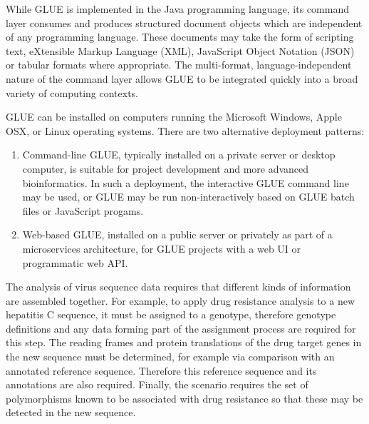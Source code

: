 While GLUE is implemented in the Java programming language, its command layer
consumes and produces structured document objects which are independent of any
programming language. These documents may take the form of scripting text,
eXtensible Markup Language (XML), JavaScript Object Notation (JSON) or tabular
formats where appropriate. The multi-format, language-independent nature of the
command layer allows GLUE to be integrated quickly into a broad variety of
computing contexts.

GLUE can be installed on computers running the Microsoft Windows, Apple OSX, or
Linux operating systems. There are two alternative deployment patterns:
\begin{enumerate}
\def\labelenumi{\arabic{enumi}.}
\item Command-line GLUE, typically installed on a private server or desktop
  computer, is suitable for project development and more advanced
  bioinformatics. In such a deployment, the interactive GLUE command line may be
  used, or GLUE may be run non-interactively based on GLUE batch files or
  JavaScript progams.
\item Web-based GLUE, installed on a public server or privately as part of a
  microservices architecture, for GLUE projects with a web UI or
  programmatic web API.
\end{enumerate}


The analysis of virus sequence data requires that different kinds of information
are assembled together. For example, to apply drug resistance analysis to a new
hepatitis C sequence, it must be assigned to a genotype, therefore genotype
definitions and any data forming part of the assignment process are required for
this step. The reading frames and protein translations of the drug target genes
in the new sequence must be determined, for example via comparison with an
annotated reference sequence. Therefore this reference sequence and its
annotations are also required. Finally, the scenario requires the set of
polymorphisms known to be associated with drug resistance so that these may be
detected in the new sequence.

